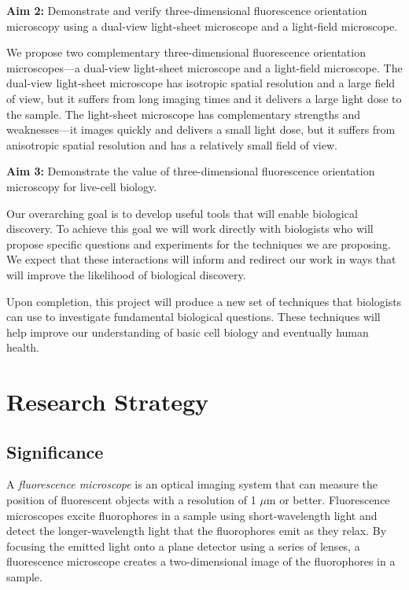 \documentclass[11pt]{article}
\begin{document}
\noindent\textbf{Aim 2:} Demonstrate and verify three-dimensional fluorescence
orientation microscopy using a dual-view light-sheet microscope and a
light-field microscope.

We propose two complementary three-dimensional fluorescence orientation
microscopes---a dual-view light-sheet microscope and a light-field
microscope. The dual-view light-sheet microscope has isotropic spatial
resolution and a large field of view, but it suffers from long imaging times and
it delivers a large light dose to the sample. The light-sheet microscope has
complementary strengths and weaknesses---it images quickly and delivers a small
light dose, but it suffers from anisotropic spatial resolution and has a
relatively small field of view.

\noindent\textbf{Aim 3:} Demonstrate the value of three-dimensional fluorescence
orientation microscopy for live-cell biology.

Our overarching goal is to develop useful tools that will enable biological
discovery. To achieve this goal we will work directly with biologists who will
propose specific questions and experiments for the techniques we are
proposing. We expect that these interactions will inform and redirect our work
in ways that will improve the likelihood of biological discovery.

Upon completion, this project will produce a new set of techniques that
biologists can use to investigate fundamental biological questions. These
techniques will help improve our understanding of basic cell biology and
eventually human health.

\pagebreak

\section*{Research Strategy}
\subsection*{Significance}
A \textit{fluorescence microscope} is an optical imaging system that can measure
the position of fluorescent objects with a resolution of 1 $\mu$m or better.
Fluorescence microscopes excite fluorophores in a sample using short-wavelength
light and detect the longer-wavelength light that the fluorophores emit as they
relax. By focusing the emitted light onto a plane detector using a series of
lenses, a fluorescence microscope creates a two-dimensional image of the
fluorophores in a sample.
\end{document}
